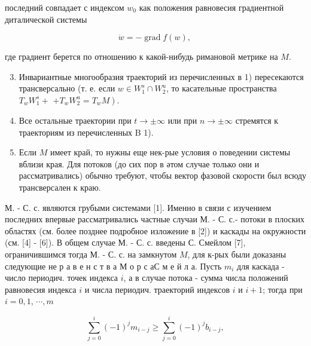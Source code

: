 \documentclass[10pt]{article}
\begin{document}
последний совпадает с индексом $w_{0}$ как положения равновесия градиентной диталической системы



\[

\dot{w}=-\operatorname{grad} f(w) \text {, }

\]



где градиент берется по отношению к какой-нибудь римановой метрике на $M$.



\begin{enumerate}

  \setcounter{enumi}{2}

  \item Инвариантные многообразия траекторий из перечисленных в 1) пересекаются трансверсально (т. е. если $w \in W_{1}^{s} \cap W_{2}^{u}$, то касательные пространства $T_{w} W_{1}^{s}+$ $\left.+T_{w} W_{2}^{u}=T_{w} M\right)$.



  \item Все остальные траектории при $t \rightarrow \pm \infty$ или при $n \rightarrow \pm \infty$ стремятся к траекториям из перечисленных B 1).



  \item Если $M$ имеет край, то нужны еще нек-рые условия о поведении системы вблизи края. Для потоков (до сих пор в әтом случае только они и рассматривались) обычно требуют, чтобы вектор фазовой скорости был всюду трансверсален к краю.



\end{enumerate}



М. - С. с. являются грубыми системами [1]. Именно в связи с изучением последних впервые рассматривались частные случаи М. - С. с.- потоки в плоских областях (см. более позднее подробное изложение в [2]) и каскады на окружности (см. [4] - [6]). В общем случае М. - С. с. введены С. Смейлом [7], ограничившимся тогда М. - С. с. на замкнутом $M$, для к-рых были доказаны следующие не р а в е н с т в а М о р с аС м е й л а. Пусть $m_{i}$ для каскада - число периодич. точек индекса $i$, а в случае потока - сумма числа положений равновесия индекса $i$ и числа периодич. траекторий индексов $i$ и $i+1$; тогда при $i=0,1$, $\cdots, m$



\[

\sum_{j=0}^{i}(-1)^{j} m_{i-j} \geqslant \sum_{j=0}^{i}(-1)^{j} b_{i-j},

\]
\end{document}
